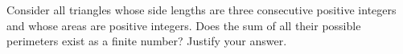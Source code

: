 Consider all triangles whose side lengths are three consecutive positive integers and whose areas are positive integers. Does the sum of all their possible perimeters exist as a finite number? Justify your answer.
